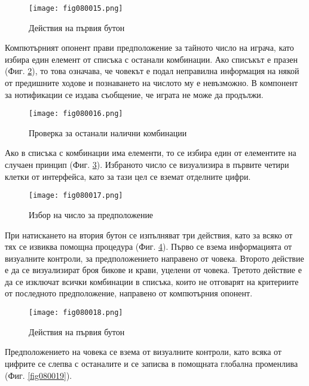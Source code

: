 \begin{figure}[H]
  \centering
  \texttt{[image: fig080015.png]}
  \caption{Действия на първия бутон}
\label{fig080015}
\end{figure}

Компютърният опонент прави предположение за тайното число на играча, като избира един елемент от списъка с останали комбинации. Ако списъкът е празен (Фиг. \ref{fig080016}), то това означава, че човекът е подал неправилна информация на някой от предишните ходове и познаването на числото му е невъзможно. В компонент за нотификации се издава съобщение, че играта не може да продължи. 

\begin{figure}[H]
  \centering
  \texttt{[image: fig080016.png]}
  \caption{Проверка за останали налични комбинации}
\label{fig080016}
\end{figure}

Ако в списъка с комбинации има елементи, то се избира един от елементите на случаен принцип (Фиг. \ref{fig080017}). Избраното число се визуализира в първите четири клетки от интерфейса, като за тази цел се вземат отделните цифри. 

\begin{figure}[H]
  \centering
  \texttt{[image: fig080017.png]}
  \caption{Избор на число за предположение}
\label{fig080017}
\end{figure}

При натискането на втория бутон се изпълняват три действия, като за всяко от тях се извиква помощна процедура (Фиг. \ref{fig080018}). Първо се взема информацията от визуалните контроли, за предположението направено от човека. Второто действие е да се визуализират броя бикове и крави, уцелени от човека. Третото действие е да се изключат всички комбинации в списъка, които не отговарят на критериите от последното предположение, направено от компютърния опонент.

\begin{figure}[H]
  \centering
  \texttt{[image: fig080018.png]}
  \caption{Действия на първия бутон}
\label{fig080018}
\end{figure}

Предположението на човека се взема от визуалните контроли, като всяка от цифрите се слепва с останалите и се записва в помощната глобална променлива (Фиг. \ref{fig080019}).

